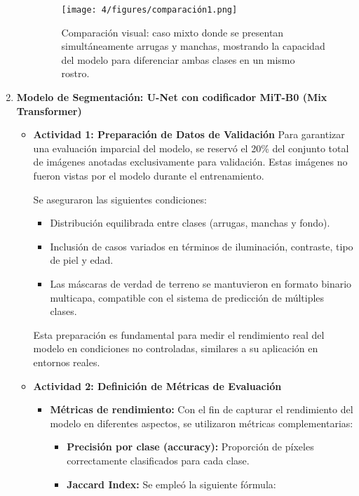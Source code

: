 \begin{enumerate}
\begin{itemize}
\begin{figure}[H]
\centering
\texttt{[image: 4/figures/comparación1.png]}
\caption{Comparación visual: caso mixto donde se presentan simultáneamente arrugas y manchas, mostrando la capacidad del modelo para diferenciar ambas clases en un mismo rostro.}
\label{fig:validacion3}
\end{figure}

  \end{itemize}


  \item \textbf{Modelo de Segmentación: U-Net con codificador MiT-B0 (Mix Transformer)}
  \begin{itemize}
  \item\textbf{Actividad 1: Preparación de Datos de Validación}
  Para garantizar una evaluación imparcial del modelo, se reservó el 20\% del conjunto total de imágenes anotadas exclusivamente para validación. Estas imágenes no fueron vistas por el modelo durante el entrenamiento.

Se aseguraron las siguientes condiciones:
\begin{itemize}
\item Distribución equilibrada entre clases (arrugas, manchas y fondo).
\item Inclusión de casos variados en términos de iluminación, contraste, tipo de piel y edad.
\item Las máscaras de verdad de terreno se mantuvieron en formato binario multicapa, compatible con el sistema de predicción de múltiples clases.
\end{itemize}

Esta preparación es fundamental para medir el rendimiento real del modelo en condiciones no controladas, similares a su aplicación en entornos reales.
  \item\textbf{Actividad 2: Definición de Métricas de Evaluación}
  \begin{itemize}

    \item \textbf{Métricas de rendimiento:}
    Con el fin de capturar el rendimiento del modelo en diferentes aspectos, se utilizaron métricas complementarias:
    
    \begin{itemize}
    \item \textbf{Precisión por clase (accuracy):} Proporción de píxeles correctamente clasificados para cada clase.
    
    \item \textbf{Jaccard Index:}
    Se empleó la siguiente fórmula:
    

\end{itemize}
\end{itemize}
\end{itemize}
\end{enumerate}
